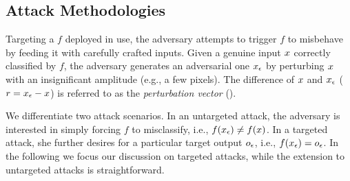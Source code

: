 \subsection{Attack Methodologies}
\label{sec:attack}

Targeting a \dnn $f$ deployed in use, the adversary attempts to trigger $f$ to misbehave by feeding it with carefully crafted inputs. Given a genuine input $x$ correctly classified by $f$, the adversary generates an adversarial one $x_{\epsilon}$ by perturbing $x$ with an insignificant amplitude (e.g., a few pixels). The difference of $x$ and $x_{\epsilon}$ ($r = x_{\epsilon} - x$) is referred to as the {\em perturbation vector} (\pv).

We differentiate two attack scenarios. In an untargeted attack, the adversary is interested in simply forcing $f$ to misclassify, i.e., $f(x_{\epsilon})\neq f(x)$. In a targeted attack, she further desires for a particular target output $o_\epsilon$, i.e., $f(x_{\epsilon}) = o_\epsilon$. In the following we focus our discussion on targeted attacks, while the extension to untargeted attacks is straightforward.
%

